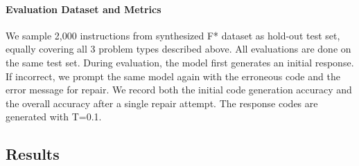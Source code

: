 \paragraph{Evaluation Dataset and Metrics} 
\label{synth simple}
We sample 2,000 instructions from synthesized F* dataset as hold-out test set, equally covering all 3 problem types described above. All evaluations are done on the same test set.
During evaluation, the model first generates an initial response. If incorrect, we prompt the same model again with the erroneous code and the error message for repair.  We record both the initial code generation accuracy and the overall accuracy after a single repair attempt. The response codes are generated with T=0.1. 

\subsection{Results}\label{sec:simplesynthreault}





